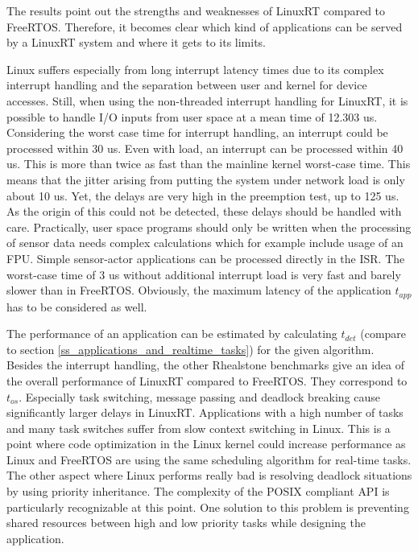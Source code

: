 The results point out the strengths and weaknesses of LinuxRT compared to FreeRTOS.
Therefore, it becomes clear which kind of applications can be served by a LinuxRT system and where it gets to its limits.
\par
Linux suffers especially from long interrupt latency times due to its complex interrupt handling and the separation between user and kernel for device accesses.
Still, when using the non-threaded interrupt handling for LinuxRT, it is possible to handle \ac{I/O} inputs from user space at a mean time of 12.303 us. Considering the worst case time for interrupt handling, an interrupt could be processed within 30 us.
Even with load, an interrupt can be processed within 40 us. 
This is more than twice as fast than the mainline kernel worst-case time.
This means that the jitter arising from putting the system under network load is only about 10 us.
Yet, the delays are very high in the preemption test, up to 125 us.
As the origin of this could not be detected, these delays should be handled with care.
Practically, user space programs should only be written when the processing of sensor data needs complex calculations which for example include usage of an \ac{FPU}.
Simple sensor-actor applications can be processed directly in the \ac{ISR}.
The worst-case time of 3 us without additional interrupt load is very fast and barely slower than in FreeRTOS. 
Obviously, the maximum latency of the application $t_{app}$ has to be considered as well.
\par
The performance of an application can be estimated by calculating $t_{det}$ (compare to section \ref{ss_applications_and_realtime_tasks}) for the given algorithm.
Besides the interrupt handling, the other Rhealstone benchmarks give an idea of the overall performance of LinuxRT compared to FreeRTOS.
They correspond to $t_{os}$. 
Especially task switching, message passing and deadlock breaking cause significantly larger delays in LinuxRT.
Applications with a high number of tasks and many task switches suffer from slow context switching in Linux. 
This is a point where code optimization in the Linux kernel could increase performance as Linux and FreeRTOS are using the same scheduling algorithm for real-time tasks.  
The other aspect where Linux performs really bad is resolving deadlock situations by using priority inheritance.
The complexity of the POSIX compliant \ac{API} is particularly recognizable at this point.
One solution to this problem is preventing shared resources between high and low priority tasks while designing the application. 
